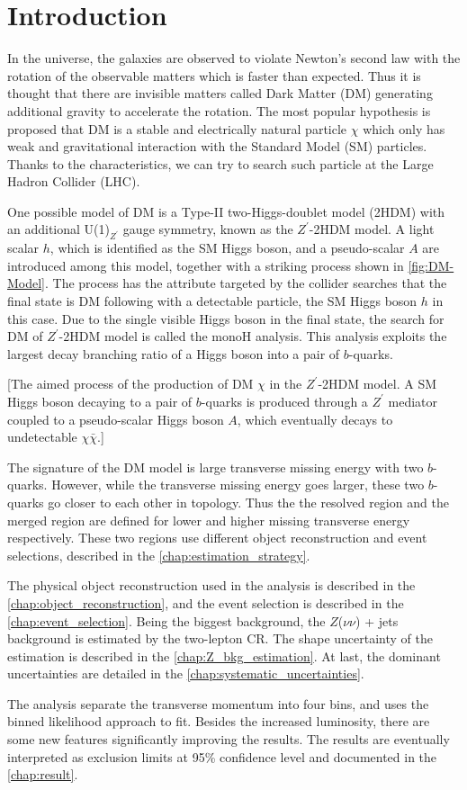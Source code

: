 \documentclass[class=NTHU_thesis, crop=false]{standalone}
\begin{document}
\chapter{Introduction}
\label{chap:Introduction}
In the universe, the galaxies are observed to violate Newton's second law with the rotation of the observable matters which is faster than expected. Thus it is thought that there are invisible matters called Dark Matter (DM) generating additional gravity to accelerate the rotation. The most popular hypothesis is proposed that DM is a stable and electrically natural particle $\chi$ which only has weak and gravitational interaction with the Standard Model (SM) particles. Thanks to the characteristics, we can try to search such particle at the Large Hadron Collider (LHC).

One possible model of DM is a Type-II two-Higgs-doublet model (2HDM) with an additional U(1)$_{Z^\prime}$ gauge symmetry, known as the $Z^\prime$-2HDM model. A light scalar $h$, which is identified as the SM Higgs boson, and a pseudo-scalar $A$ are introduced among this model, together with a striking process shown in \cref{fig:DM-Model}. The process has the attribute targeted by the collider searches that the final state is DM following with a detectable particle, the SM Higgs boson $h$ in this case. Due to the single visible Higgs boson in the final state, the search for DM of $Z^\prime$-2HDM model is called the monoH analysis. This analysis exploits the largest decay branching ratio of a Higgs boson into a pair of $b$-quarks.

[The aimed process of the production of DM $\chi$ in the $Z^\prime$-2HDM model. A SM Higgs boson decaying to a pair of $b$-quarks is produced through a $Z^\prime$ mediator coupled to a pseudo-scalar Higgs boson $A$, which eventually decays to undetectable $\chi\bar{\chi}$.]

The signature of the DM model is large transverse missing energy with two $b$-quarks. However, while the transverse missing energy goes larger, these two $b$-quarks go closer to each other in topology. Thus the the resolved region and the merged region are defined for lower and higher missing transverse energy respectively. These two regions use different object reconstruction and event selections, described in the \autoref{chap:estimation_strategy}.

The physical object reconstruction used in the analysis is described in the \autoref{chap:object_reconstruction}, and the event selection is described in the \autoref{chap:event_selection}. Being the biggest background, the $Z$($\nu\nu$) + jets background is estimated by the two-lepton CR. The shape uncertainty of the estimation is described in the \autoref{chap:Z_bkg_estimation}. At last, the dominant uncertainties are detailed in the \autoref{chap:systematic_uncertainties}.

The analysis separate the transverse momentum into four bins, and uses the binned likelihood approach to fit. Besides the increased luminosity, there are some new features significantly improving the results. The results are eventually interpreted as exclusion limits at 95\% confidence level and documented in the \autoref{chap:result}.
\end{document}
